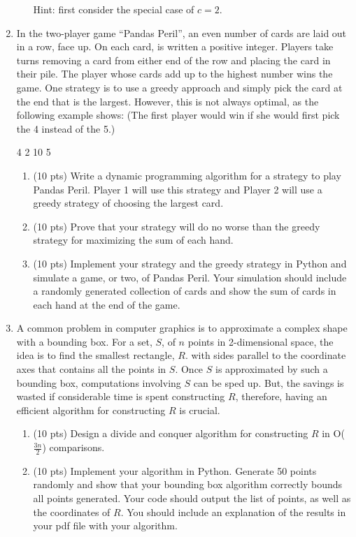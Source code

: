 \documentclass[12pt]{article}
\begin{document}
\begin{enumerate}
\begin{enumerate}
	Hint: first consider the special case of $c=2$.

	\end{enumerate}

	
\item In the two-player game “Pandas Peril”, an even number of cards are laid out in a row, face up. On each card, is written a positive integer. Players take turns removing a card from either end of the row and placing the card in their pile. The player whose cards add up to the highest number wins the game.
One strategy is to use a greedy approach and simply pick the card at the end that is the largest. However, this is not always optimal, as the following example shows: (The first player would win if she would first pick the 4 instead of the 5.)

4 2 10 5

\begin{enumerate}
\item (10 pts) Write a dynamic programming algorithm for a strategy to play Pandas Peril. Player 1 will use this strategy and Player 2 will use a greedy strategy of choosing the largest card.
\item (10 pts) Prove that your strategy will do no worse than the greedy strategy for maximizing the sum of each hand.
\item (10 pts) Implement your strategy and the greedy strategy in Python and simulate a game, or two, of Pandas Peril. Your simulation should include a randomly generated collection of cards and show the sum of cards in each hand at the end of the game. 
\end{enumerate}

\item A common problem in computer graphics is to approximate a complex shape with a bounding box. For a set, $S$, of $n$ points in 2-dimensional space, the idea is to find the smallest rectangle, $R$. with sides parallel to the coordinate axes that contains all the points in $S$. Once $S$ is approximated by such a bounding box, computations involving $S$ can be sped up. But, the savings is wasted if considerable time is spent constructing $R$, therefore, having an efficient algorithm for constructing $R$ is crucial. 
\begin{enumerate}
\item (10 pts) Design a divide and conquer algorithm for constructing $R$ in O($\frac{3n}{2}$) comparisons.
\item (10 pts) Implement your algorithm in Python. Generate 50 points randomly and show that your bounding box algorithm correctly bounds all points generated. Your code should output the list of points, as well as the coordinates of $R$. You should include an explanation of the results in your pdf file with your algorithm.
\end{enumerate}


\end{enumerate}
\end{document}
